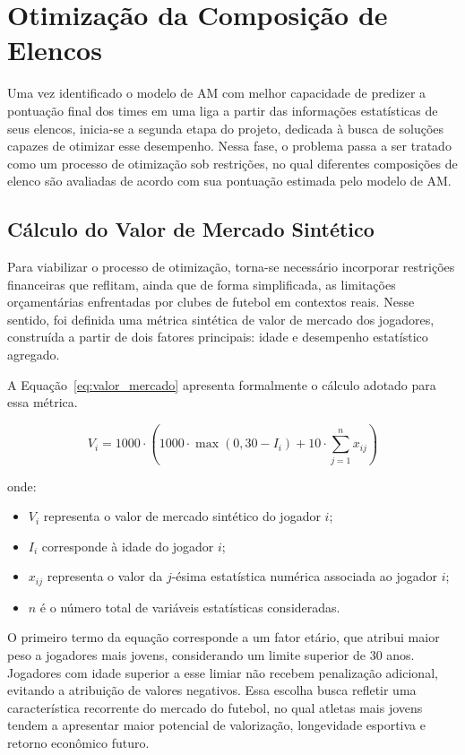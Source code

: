 \chapter{Otimização da Composição de Elencos}

Uma vez identificado o modelo de AM com melhor capacidade de predizer a pontuação final dos times em uma liga a partir das informações estatísticas de seus elencos, 
inicia-se a segunda etapa do projeto, dedicada à busca de soluções capazes de otimizar esse desempenho. 
Nessa fase, o problema passa a ser tratado como um processo de otimização sob restrições, no qual diferentes composições de elenco são avaliadas de acordo com 
sua pontuação estimada pelo modelo de AM.

\section{Cálculo do Valor de Mercado Sintético}

Para viabilizar o processo de otimização, torna-se necessário incorporar restrições financeiras que reflitam, ainda que de forma simplificada, 
as limitações orçamentárias enfrentadas por clubes de futebol em contextos reais. 
Nesse sentido, foi definida uma métrica sintética de valor de mercado dos jogadores, construída a partir de dois fatores principais: 
idade e desempenho estatístico agregado.

A Equação~\ref{eq:valor_mercado} apresenta formalmente o cálculo adotado para essa métrica.

\begin{equation}
\label{eq:valor_mercado}
V_i = 1000 \cdot \left( 1000 \cdot \max(0, 30 - I_i) + 10 \cdot \sum_{j=1}^{n} x_{ij} \right)
\end{equation}

onde:
\begin{itemize}
    \item $V_i$ representa o valor de mercado sintético do jogador $i$;
    \item $I_i$ corresponde à idade do jogador $i$;
    \item $x_{ij}$ representa o valor da $j$-ésima estatística numérica associada ao jogador $i$;
    \item $n$ é o número total de variáveis estatísticas consideradas.
\end{itemize}

O primeiro termo da equação corresponde a um fator etário, que atribui maior peso a jogadores mais jovens, considerando um limite superior de 30 anos. 
Jogadores com idade superior a esse limiar não recebem penalização adicional, evitando a atribuição de valores negativos. 
Essa escolha busca refletir uma característica recorrente do mercado do futebol, no qual atletas mais jovens tendem a apresentar maior potencial de valorização, 
longevidade esportiva e retorno econômico futuro.

